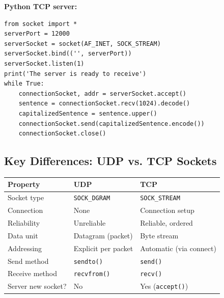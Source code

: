 \textbf{Python TCP server:}
\begin{lstlisting}
from socket import *
serverPort = 12000
serverSocket = socket(AF_INET, SOCK_STREAM)
serverSocket.bind(('', serverPort))
serverSocket.listen(1)
print('The server is ready to receive')
while True:
    connectionSocket, addr = serverSocket.accept()
    sentence = connectionSocket.recv(1024).decode()
    capitalizedSentence = sentence.upper()
    connectionSocket.send(capitalizedSentence.encode())
    connectionSocket.close()
\end{lstlisting}

\subsection{Key Differences: UDP vs. TCP Sockets}

\begin{keybox}
\begin{tabular}{lll}
\toprule
\textbf{Property} & \textbf{UDP} & \textbf{TCP} \\
\midrule
Socket type & \texttt{SOCK\_DGRAM} & \texttt{SOCK\_STREAM} \\
Connection & None & Connection setup \\
Reliability & Unreliable & Reliable, ordered \\
Data unit & Datagram (packet) & Byte stream \\
Addressing & Explicit per packet & Automatic (via connect) \\
Send method & \texttt{sendto()} & \texttt{send()} \\
Receive method & \texttt{recvfrom()} & \texttt{recv()} \\
Server new socket? & No & Yes (\texttt{accept()}) \\
\bottomrule
\end{tabular}
\end{keybox}

